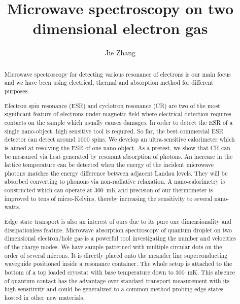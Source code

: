 \documentclass[12pt]{ruthesis}
\title{Microwave spectroscopy on two dimensional electron gas}
\author{Jie Zhang}
\begin{document}
  \begin{frontmatter}
   \maketitle

\begin{abstract}

Microwave spectroscopy for detecting various resonance  of electrons is our main focus and we have been using electrical, thermal and absorption method for different purposes.

Electron spin resonance (ESR) and cyclotron resonance (CR) are two of the most significant feature of electrons under magnetic field where electrical detection requires contacts on the sample which usually causes damages.
In order to detect the ESR of a single nano-object, high sensitive tool is required.
So far, the best commercial ESR detector can detect around 1000 spins.
We develop an ultra-sensitive calorimeter which is aimed at resolving the ESR of one nano-object.
As a pretest, we show that CR can be measured via heat generated by resonant absorption of photons.
An increase in the lattice temperature can be detected when the energy of the incident microwave photons matches the energy difference between adjacent Landau levels.
They will be absorbed converting to phonons via non-radiative relaxation.
A nano-calorimetry is constructed which can operate at \SI{300}{\milli\kelvin} and precision of our thermometer is improved to tens of micro-Kelvins, thereby increasing the sensitivity to several nano-watts.

Edge state transport is also an interest of ours due to its pure one dimensionality and dissipationless feature.
Microwave absorption spectroscopy of quantum droplet on two dimensional electron/hole gas is a powerful tool investigating the number and velocities of the charge modes.
We have sample patterned with multiple circular dots on the order of several microns.
It is directly placed onto the meander line superconducting waveguide positioned inside a resonance container.
The whole setup is attached to the bottom of a top loaded  cryostat with base temperature down to \SI{300}{\milli\kelvin}.
This absence of quantum contact has the advantage over standard transport measurement with its high sensitivity and could be generalized to a common method probing edge states hosted in other new materials.


\end{abstract}

%
\tableofcontents
\listoffigures
%   
\end{frontmatter}
\end{document}
